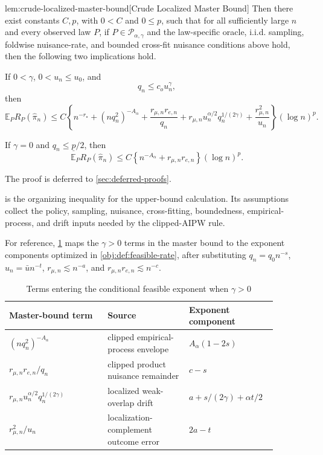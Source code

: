\documentclass[11pt]{article}
\begin{document}
\begin{lemmav}{lem:crude-localized-master-bound}[Crude Localized Master Bound]
Then there exist constants \(C,p\), with \(0<C\) and \(0\le p\), such that for all sufficiently large \(n\) and every observed law \(P\), if \(P\in\mathcal P_{\alpha,\gamma}\) and the law-specific oracle, i.i.d. sampling, foldwise nuisance-rate, and bounded cross-fit nuisance conditions above hold, then the following two implications hold.

If \(0<\gamma\), \(0<u_n\le u_0\), and
\[
q_n\le c_o u_n^\gamma,
\]
then
\[
\mathbb E_P R_P(\widehat\pi_n)
\le
C\left\{
n^{-r_\star}
+(nq_n^2)^{-A_\alpha}
+\frac{r_{\mu,n}r_{e,n}}{q_n}
+r_{\mu,n}u_n^{\alpha/2}q_n^{1/(2\gamma)}
+\frac{r_{\mu,n}^2}{u_n}
\right\}(\log n)^p .
\]

If \(\gamma=0\) and \(q_n\le \underline p/2\), then
\[
\mathbb E_P R_P(\widehat\pi_n)
\le
C\left\{
n^{-A_\alpha}+r_{\mu,n}r_{e,n}
\right\}(\log n)^p .
\]
\end{lemmav}

The proof is deferred to \cref{sec:deferred-proofs}.

 is the organizing inequality for the upper-bound calculation.  Its assumptions collect the policy, sampling, nuisance, cross-fitting, boundedness, empirical-process, and drift inputs needed by the clipped-AIPW rule.

For reference, \cref{tab:feasible-balance} maps the \(\gamma>0\) terms in the master bound to the exponent components optimized in \cref{obj:def:feasible-rate}, after substituting \(q_n=q_0n^{-s}\), \(u_n=\bar u n^{-t}\), \(r_{\mu,n}\lesssim n^{-a}\), and \(r_{\mu,n}r_{e,n}\lesssim n^{-c}\).

\begin{table}[t]
\centering
\caption{Terms entering the conditional feasible exponent when \(\gamma>0\)}
\label{tab:feasible-balance}
\begin{tabular}{p{0.34\linewidth}p{0.28\linewidth}p{0.26\linewidth}}
\hline
Master-bound term & Source & Exponent component \\
\hline
\((nq_n^2)^{-A_\alpha}\) & clipped empirical-process envelope & \(A_\alpha(1-2s)\) \\
\(r_{\mu,n}r_{e,n}/q_n\) & clipped product nuisance remainder & \(c-s\) \\
\(r_{\mu,n}u_n^{\alpha/2}q_n^{1/(2\gamma)}\) & localized weak-overlap drift & \(a+s/(2\gamma)+\alpha t/2\) \\
\(r_{\mu,n}^2/u_n\) & localization-complement outcome error & \(2a-t\) \\
\hline
\end{tabular}
\end{table}
\end{document}
